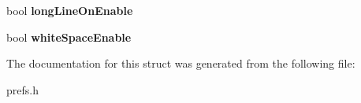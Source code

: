 \begin{DoxyCompactItemize}
\item 
\hypertarget{struct_common_info_acb671c443595c7065a6a8fe5a22dfcf4}{bool {\bfseries long\+Line\+On\+Enable}}\label{struct_common_info_acb671c443595c7065a6a8fe5a22dfcf4}

\item 
\hypertarget{struct_common_info_a5478324f28d021402e4c5ca4859217f2}{bool {\bfseries white\+Space\+Enable}}\label{struct_common_info_a5478324f28d021402e4c5ca4859217f2}

\end{DoxyCompactItemize}


The documentation for this struct was generated from the following file\+:\begin{DoxyCompactItemize}
\item 
prefs.\+h\end{DoxyCompactItemize}
